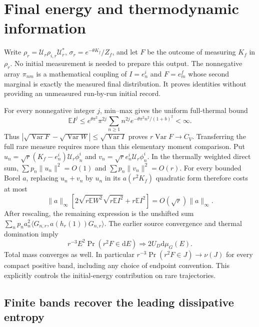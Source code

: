 \documentclass[aps,prl,reprint,superscriptaddress,longbibliography]{revtex4-2}
\newcommand{\Var}{\operatorname{Var}}
\newcommand{\dd}{\mathrm{d}}
\begin{document}
\section{Final energy and thermodynamic information}
\label{th:info}

Write $\rho_r=\mathcal U_r\rho_{i,r}\mathcal U_r^*$, $\sigma_r=e^{-\theta K_f}/Z_f$, and let $F$ be the outcome of measuring $K_f$ in $\rho_r$. No initial measurement is needed to prepare this output. The nonnegative array $\pi_{nm}$ is a mathematical coupling of $I=e_n^i$ and $F=e_m^f$ whose second marginal is exactly the measured final distribution. It proves identities without providing an unmeasured run-by-run initial record.

For every nonnegative integer $j$, min--max gives the uniform full-thermal bound
\begin{equation}
 \mathbb EI^j\le e^{\theta\pi^2}\pi^{2j}
 \sum_{n\ge1}n^{2j}e^{-\theta\pi^2n^2/(1+b)^2}<\infty.
 \label{th:initialmoment}
\end{equation}
Thus $|\sqrt{\Var F}-\sqrt{\Var W}|\le\sqrt{\Var I}$ proves $r\Var F\to C_V$. Transferring the full rare measure requires more than this elementary moment comparison. Put $u_n=\sqrt r(K_f-e_n^i)\mathcal U_r\phi_n^i$ and $v_n=\sqrt r e_n^i\mathcal U_r\phi_n^i$. In the thermally weighted direct sum, $\sum p_n\|u_n\|^2=O(1)$ and $\sum p_n\|v_n\|^2=O(r)$. For every bounded Borel $a$, replacing $u_n+v_n$ by $u_n$ in its $a(r^2K_f)$ quadratic form therefore costs at most
\begin{equation}
 \|a\|_\infty\left[2\sqrt{r\mathbb EW^2}\sqrt{r\mathbb EI^2}
 +r\mathbb EI^2\right]=O(\sqrt r)\|a\|_\infty.
 \label{th:transfer}
\end{equation}
After rescaling, the remaining expression is the unshifted sum
\(\sum_np_na_n^2\langle G_{n,r},a(h_r(1))G_{n,r}\rangle\).
The earlier source convergence and thermal domination imply
\begin{equation}
 r^{-3}E^2\Pr(r^2F\in\dd E)\Rightarrow2U_D\dd\mu_G(E).
 \label{th:finalmeasure}
\end{equation}
Total mass converges as well. In particular $r^{-3}\Pr(r^2F\in J)\to\nu(J)$ for every compact positive band, including any choice of endpoint convention. This explicitly controls the initial-energy contribution on rare trajectories.

\subsection{Finite bands recover the leading dissipative entropy}
\end{document}
